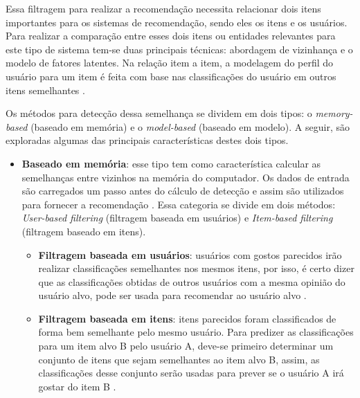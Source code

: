 Essa filtragem para realizar a recomendação necessita relacionar dois itens importantes para os sistemas de recomendação, sendo eles os itens e os usuários. Para realizar a comparação entre esses dois itens ou entidades relevantes para este tipo de sistema tem-se duas principais técnicas: abordagem de vizinhança e o modelo de fatores latentes. Na relação item a item, a modelagem do perfil do usuário para um item é feita com base nas classificações do usuário em outros itens semelhantes \cite{Koren:2015}.

Os métodos para detecção dessa semelhança se dividem em dois tipos: o \textit{memory-based} (baseado em memória) e o \textit{model-based} (baseado em modelo). A seguir, são exploradas algumas das principais características destes dois tipos.


\begin{itemize}
    \item \textbf{Baseado em memória}: esse tipo tem como característica calcular as semelhanças entre vizinhos na memória do computador. Os dados de entrada são carregados um passo antes do cálculo de detecção e assim são utilizados para fornecer a recomendação \cite{Levinas2014AnAO}. Essa categoria se divide em dois métodos: \textit{User-based filtering} (filtragem baseada em usuários) e \textit{Item-based filtering} (filtragem baseado em itens). 
    \begin{itemize}
        \item \textbf{Filtragem baseada em usuários}: usuários com gostos parecidos irão realizar classificações semelhantes nos mesmos itens, por isso, é certo dizer que as classificações obtidas de outros usuários com a mesma opinião do usuário alvo, pode ser usada para recomendar ao usuário alvo \cite{Cimini:2019}.
        \item \textbf{Filtragem baseada em itens}: itens parecidos foram classificados de forma bem semelhante pelo mesmo usuário. Para predizer as classificações para um item alvo B pelo usuário A, deve-se primeiro determinar um conjunto de itens que sejam semelhantes ao item alvo B, assim, as classificações desse conjunto serão usadas para prever se o usuário A irá gostar do item B \cite{Cimini:2019}.
    \end{itemize}
         
\end{itemize}

